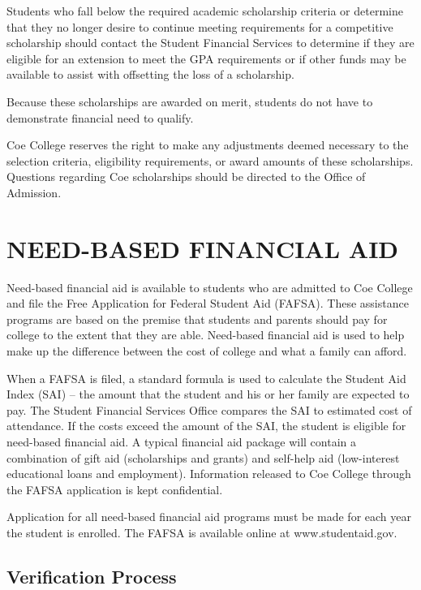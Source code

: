 \documentclass[
  letterpaper,
]{scrbook}
\begin{document}
Students who fall below the required academic scholarship criteria or
determine that they no longer desire to continue meeting requirements
for a competitive scholarship should contact the Student Financial
Services to determine if they are eligible for an extension to meet the
GPA requirements or if other funds may be available to assist with
offsetting the loss of a scholarship.

Because these scholarships are awarded on merit, students do not have to
demonstrate financial need to qualify.

Coe College reserves the right to make any adjustments deemed necessary
to the selection criteria, eligibility requirements, or award amounts of
these scholarships. Questions regarding Coe scholarships should be
directed to the Office of Admission.

\section{NEED-BASED FINANCIAL AID}\label{need-based-financial-aid}

Need-based financial aid is available to students who are admitted to
Coe College and file the Free Application for Federal Student Aid
(FAFSA). These assistance programs are based on the premise that
students and parents should pay for college to the extent that they are
able. Need-based financial aid is used to help make up the difference
between the cost of college and what a family can afford.

When a FAFSA is filed, a standard formula is used to calculate the
Student Aid Index (SAI) -- the amount that the student and his or her
family are expected to pay. The Student Financial Services Office
compares the SAI to estimated cost of attendance. If the costs exceed
the amount of the SAI, the student is eligible for need-based financial
aid. A typical financial aid package will contain a combination of gift
aid (scholarships and grants) and self-help aid (low-interest
educational loans and employment). Information released to Coe College
through the FAFSA application is kept confidential.

Application for all need-based financial aid programs must be made for
each year the student is enrolled. The FAFSA is available online at
www.studentaid.gov.

\subsection{Verification Process}\label{verification-process}
\end{document}
